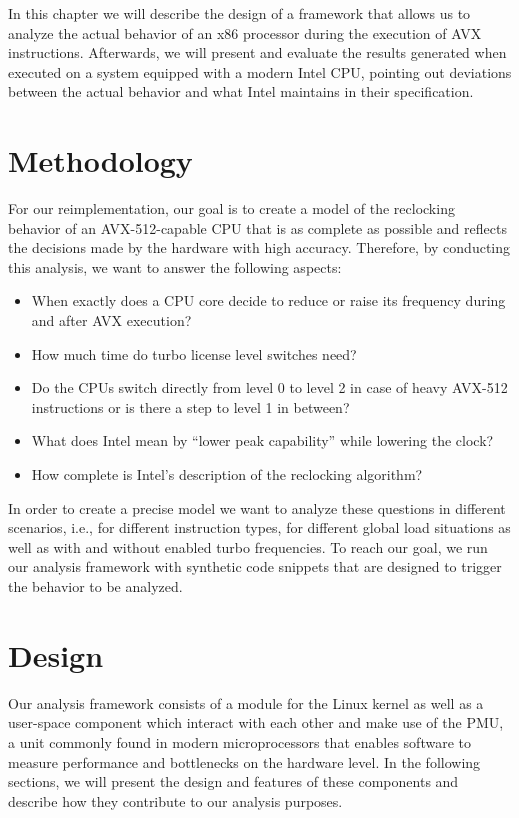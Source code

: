 In this chapter we will describe the design of a framework that allows us to analyze the actual behavior of an x86 processor during the execution of \gls{AVX} instructions. Afterwards, we will present and evaluate the results generated when executed on a system equipped with a modern Intel \gls{CPU}, pointing out deviations between the actual behavior and what Intel maintains in their specification.

\section{Methodology}
\label{sec:analysis:methodology}

For our reimplementation, our goal is to create a model of the reclocking behavior of an \gls{AVX-512}-capable \gls{CPU} that is as complete as possible and reflects the decisions made by the hardware with high accuracy. Therefore, by conducting this analysis, we want to answer the following aspects:

\begin{itemize}
	\item When exactly does a \gls{CPU} core decide to reduce or raise its frequency during and after \gls{AVX} execution?
	\item How much time do turbo license level switches need?
	\item Do the \glspl{CPU} switch directly from level 0 to level 2 in case of heavy \gls{AVX-512} instructions or is there a step to level 1 in between?
	\item What does Intel mean by \enquote{lower peak capability} while lowering the clock?
	\item How complete is Intel's description of the reclocking algorithm?
\end{itemize}

In order to create a precise model we want to analyze these questions in different scenarios, i.e., for different instruction types, for different global load situations as well as with and without enabled turbo frequencies. To reach our goal, we run our analysis framework with synthetic code snippets that are designed to trigger the behavior to be analyzed.

\section{Design}
\label{sec:analysis:design}

Our analysis framework consists of a module for the \gls{Linux} kernel as well as a user-space component which interact with each other and make use of the \gls{PMU}, a unit commonly found in modern microprocessors that enables software to measure performance and bottlenecks on the hardware level. In the following sections, we will present the design and features of these components and describe how they contribute to our analysis purposes.

